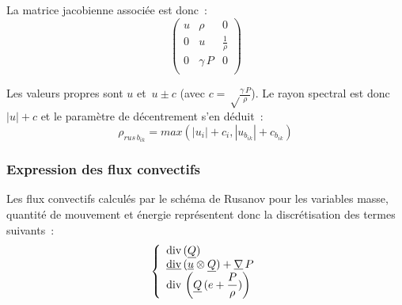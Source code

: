 La matrice jacobienne associ\'ee est donc~:
\begin{equation}
\left(\begin{array}{lll}
\displaystyle u & \rho                 & 0                                \\
\displaystyle 0 & u                    & \displaystyle\frac{1}{\rho}        \\
\displaystyle 0 & \gamma\, P        & 0                                 \\
\end{array}\right)
\end{equation}

Les valeurs propres sont $u$ et $\displaystyle\,u\pm c$ (avec
$c=\sqrt\frac{\gamma\,P}{\rho}$). Le rayon spectral est donc
$|u|+c$ et le param\`etre de d\'ecentrement s'en d\'eduit~:
\begin{equation}
\rho_{rus\,{b}_{ik}} = max\left(|u_i|+c_i,|u_{{b}_{ik}}|+c_{{b}_{ik}}\right)
\end{equation}


\subsubsection*{Expression des flux convectifs}

Les flux convectifs calcul\'es par le sch\'ema de Rusanov
pour les variables masse, quantit\'e de mouvement
et \'energie repr\'esentent donc la discr\'etisation des termes suivants~:
\begin{equation}
\left\{\begin{array}{l}
\displaystyle\text{div}\,(\underline{Q})\\
\displaystyle\underline{\text{div}}\,(\underline{u}\otimes\underline{Q})+\underline{\nabla}\,P\\
\displaystyle\text{div}\,\left(\underline{Q}\,(e+\frac{P}{\rho})\right)
\end{array}\right.
\end{equation}

